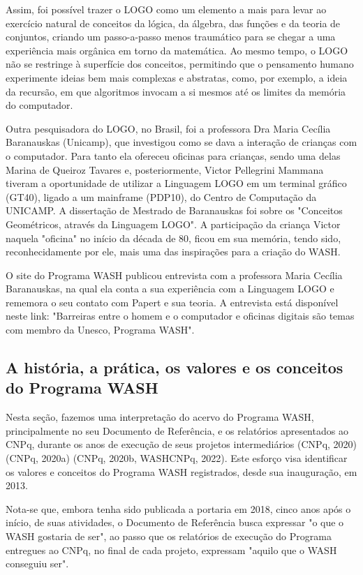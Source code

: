 Assim, foi possível trazer o LOGO como um elemento a mais para levar ao exercício natural de conceitos da lógica, da álgebra, das funções e da teoria de conjuntos, criando um passo-a-passo menos traumático para se chegar a uma experiência mais orgânica em torno da matemática. Ao mesmo tempo, o LOGO não se restringe à superfície dos conceitos, permitindo que o pensamento humano experimente ideias bem mais complexas e abstratas, como, por exemplo, a ideia da recursão, em que algoritmos invocam a si mesmos até os limites da memória do computador.

Outra pesquisadora do LOGO, no Brasil, foi a professora  Dra Maria Cecília Baranauskas (Unicamp), que investigou como  se dava a interação de crianças com o computador. Para tanto ela ofereceu oficinas para  crianças, sendo uma delas Marina de Queiroz Tavares  e, posteriormente, Victor Pellegrini Mammana  tiveram a oportunidade  de  utilizar a Linguagem LOGO em um terminal gráfico (GT40), ligado a um mainframe (PDP10), do Centro de Computação da UNICAMP. A dissertação de Mestrado de Baranauskas foi sobre os "Conceitos Geométricos, através da Linguagem LOGO". A participação da criança Victor naquela "oficina" no início da década de 80, ficou em sua memória, tendo sido, reconhecidamente por ele, mais uma das inspirações para a criação do WASH.

O site do Programa WASH publicou entrevista com a professora Maria Cecília Baranauskas, na qual ela conta a sua experiência com a Linguagem LOGO e rememora o seu contato com Papert e sua teoria. A entrevista está disponível neste link: "Barreiras entre o homem e o computador e oficinas digitais são temas com membro da Unesco, Programa WASH".

\subsection[A história, a prática, os valores e os conceitos do Programa WASH]{A história, a prática, os valores e os conceitos do Programa WASH}\label{A história, a prática, os valores e os conceitos do Programa WASH}
Nesta seção, fazemos uma interpretação do acervo do Programa WASH, principalmente no seu Documento de Referência, e os relatórios apresentados ao CNPq, durante os anos de execução de seus projetos intermediários (CNPq, 2020)  (CNPq, 2020a) (CNPq, 2020b, WASHCNPq, 2022). Este esforço visa identificar os valores e conceitos do Programa WASH registrados, desde sua inauguração, em 2013.

Nota-se que, embora tenha sido publicada a portaria em 2018, cinco anos após o início, de suas atividades, o Documento de Referência busca expressar "o que o WASH gostaria de ser", ao passo que os relatórios de execução do Programa entregues ao CNPq, no final de cada projeto, expressam "aquilo que o WASH conseguiu ser".

